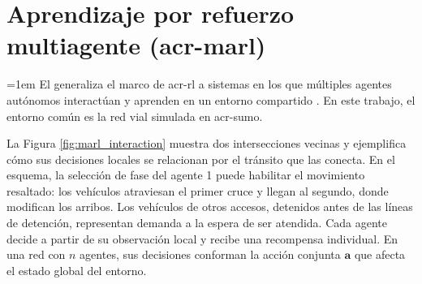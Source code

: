 \section[Aprendizaje por refuerzo multiagente (MARL)]{Aprendizaje por refuerzo \\ multiagente (\acrshort{acr-marl})}\label{sec:marl}

\begingroup\emergencystretch=1em
El  generaliza el marco de \acrshort{acr-rl} a sistemas en los que múltiples agentes autónomos interactúan y aprenden en un entorno compartido \cite{marlbook}. En este trabajo, el entorno común es la red vial simulada en \acrshort{acr-sumo}.\par

La Figura \ref{fig:marl_interaction} muestra dos intersecciones vecinas y ejemplifica cómo sus decisiones locales se relacionan por el tránsito que las conecta. En el esquema, la selección de fase del agente 1 puede habilitar el movimiento resaltado: los vehículos atraviesan el primer cruce y llegan al segundo, donde modifican los arribos. Los vehículos de otros accesos, detenidos antes de las líneas de detención, representan demanda a la espera de ser atendida. Cada agente decide a partir de su observación local y recibe una recompensa individual. En una red con $n$ agentes, sus decisiones conforman la acción conjunta $\mathbf{a}$ que afecta el estado global del entorno.\par\endgroup

